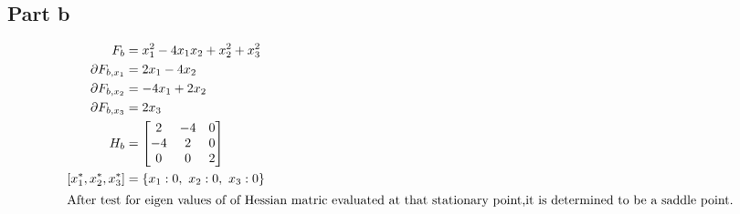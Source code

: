 \documentclass[a4paper,12pt]{article} %
\begin{document}
\subsection{Part b}
\begin{align*}
  F_b &= x_{1}^{2} - 4 x_{1} x_{2} + x_{2}^{2} + x_{3}^{2}\\
  \partial F_{b,x_1} &= 2 x_{1} - 4 x_{2}\\
  \partial F_{b,x_2} &= - 4 x_{1} + 2 x_{2}\\
  \partial F_{b,x_3} &=2 x_{3}\\
  H_b &= \left[\begin{matrix}2 & -4 & 0\\-4 & 2 & 0\\0 & 0 & 2\end{matrix}\right]\\
  \left[x_1^*, x_2^*, x_3^*\right] &= \left\{ x_{1} : 0, \  x_{2} : 0, \  x_{3} : 0\right\}\\
  \intertext{After test for eigen values of of Hessian matric evaluated at that stationary point,it is 
  determined to be a saddle point.}
\end{align*}
\end{document}
